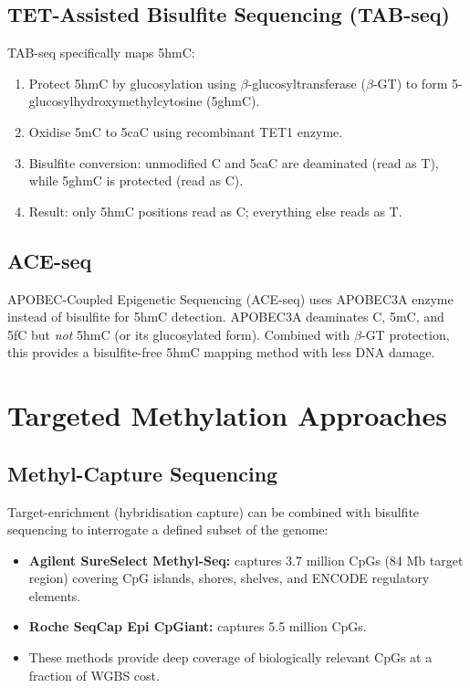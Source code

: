 \subsection{TET-Assisted Bisulfite Sequencing (TAB-seq)}

TAB-seq specifically maps 5hmC:

\begin{enumerate}[itemsep=2pt]
  \item Protect 5hmC by glucosylation using $\beta$-glucosyltransferase ($\beta$-GT) to form 5-glucosylhydroxymethylcytosine (5ghmC).
  \item Oxidise 5mC to 5caC using recombinant TET1 enzyme.
  \item Bisulfite conversion: unmodified C and 5caC are deaminated (read as T), while 5ghmC is protected (read as C).
  \item Result: only 5hmC positions read as C; everything else reads as T.
\end{enumerate}

\subsection{ACE-seq}

APOBEC-Coupled Epigenetic Sequencing (ACE-seq) uses APOBEC3A enzyme instead of bisulfite for 5hmC detection. APOBEC3A deaminates C, 5mC, and 5fC but \textit{not} 5hmC (or its glucosylated form). Combined with $\beta$-GT protection, this provides a bisulfite-free 5hmC mapping method with less DNA damage.

\section{Targeted Methylation Approaches}
\label{sec:methylation:targeted}

\subsection{Methyl-Capture Sequencing}

Target-enrichment (hybridisation capture) can be combined with bisulfite sequencing to interrogate a defined subset of the genome:

\begin{itemize}[itemsep=2pt]
  \item \textbf{Agilent SureSelect Methyl-Seq:} captures 3.7 million CpGs (84 Mb target region) covering CpG islands, shores, shelves, and ENCODE regulatory elements.
  \item \textbf{Roche SeqCap Epi CpGiant:} captures 5.5 million CpGs.
  \item These methods provide deep coverage of biologically relevant CpGs at a fraction of WGBS cost.
\end{itemize}

